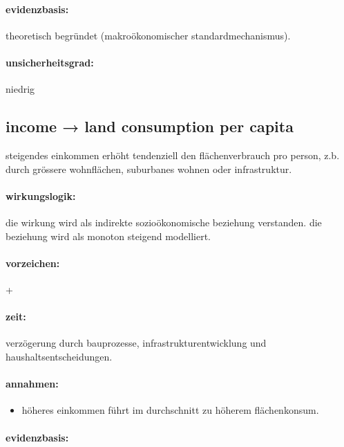 \documentclass[11pt, a4paper, oneside]{scrartcl}
\begin{document}
\paragraph{evidenzbasis:}

theoretisch begründet (makroökonomischer standardmechanismus).

\paragraph{unsicherheitsgrad:} 

niedrig

\subsection{income → land consumption per capita}
steigendes einkommen erhöht tendenziell den flächenverbrauch pro person, z.b. durch grössere wohnflächen, suburbanes wohnen oder infrastruktur.

\paragraph{wirkungslogik:}

die wirkung wird als indirekte sozioökonomische beziehung verstanden.  
die beziehung wird als monoton steigend modelliert.

\paragraph{vorzeichen:}

+

\paragraph{zeit:} 

verzögerung durch bauprozesse, infrastrukturentwicklung und haushaltsentscheidungen.

\paragraph{annahmen:}
\begin{itemize}
\item höheres einkommen führt im durchschnitt zu höherem flächenkonsum. 
\end{itemize}

\paragraph{evidenzbasis:}
\end{document}
